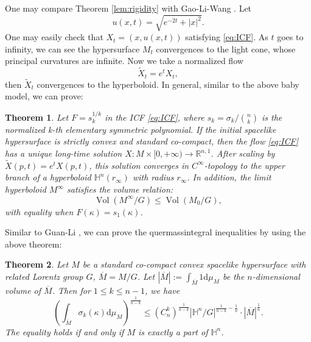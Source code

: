 \documentclass[10pt,a4paper]{amsart}
\newtheorem{theorem}{Theorem}[section]
\newcommand{\abs}[1]{\left\lvert{#1}\right\rvert}
\newcommand{\dd}{\ensuremath{\text{d}}}
\newcommand{\R}{\ensuremath{\mathbb{R}}}
\renewcommand{\H}{{\mathbb{H}}}
\numberwithin{equation}{section}
\begin{document}
 One may compare Theorem  \ref{lem:rigidity} with Gao-Li-Wang \cite{GaoLiW}. 
Let 
$$u(x,t)=\sqrt{e^{-2t}+|x|^2}.$$  
One may easily check that $X_t=(x,u(x,t))$ satisfying \eqref{eq:ICF}. As $t$ goes to infinity, we can see the hypersurface $M_t$ convergences to the light cone, whose principal curvatures are infinite. Now we take a normalized flow 
$$\tilde{X}_t=e^t X_t,$$   
then $\tilde{X}_t$ convergences to the hyperboloid. In general, similar to the above baby model, we can prove:   


\begin{theorem}\label{thm:convergence}
    Let \(F = s_k^{1/k}\) in the ICF \eqref{eq:ICF}, where \(s_k = {\sigma_k}/{\binom{n}{k}}\) is the normalized k-th elementary symmetric polynomial. If the initial spacelike hypersurface is strictly convex and standard co-compact, then the flow \eqref{eq:ICF} has a unique long-time solution \(X: M\times [0,+\infty)\to \R^{n,1}\). After scaling by \(\tilde{X}(p,t) = e^t X(p,t)\), this solution converges in \(C^{\infty}\)-topology to the upper branch of a hyperboloid \(\H^n(r_\infty)\) with radius \(r_{\infty}\). In addition, the limit hyperboloid \(M^{\infty}\) satisfies the volume relation: 
    \begin{equation*}
        \operatorname{Vol} (M^{\infty}/G) \leq \operatorname{Vol} (M_0/G),
    \end{equation*}
    with equality when \(F(\kappa) = s_1(\kappa)\). 
\end{theorem}



Similar to Guan-Li \cite{Guan2009}, we can prove the quermassintegral inequalities by using the above theorem:
\begin{theorem}\label{thm:quermassintegral_ineq}
    Let \(M\) be a standard co-compact convex spacelike hypersurface with related Lorentz group \(G\), \(\overline{M} = M / G\). Let \(\abs{\overline{M}} := \int_{\overline{M}} 1 \dd \mu_M\) be the \(n\)-dimensional volume of $\overline{M}$. Then for \(1\leq k \leq n-1\), we have
    \begin{equation}\label{eq:geo-ineq}
         {\left( \int_{\overline{M}} \sigma_k(\kappa) \dd \mu_M \right)^{\frac{1}{n-k}}} \leq {(C_n^k)^{\frac{1}{n-k}}\abs{\H^n / G}^{\frac{1}{n-k} - \frac{1}{n}}} \cdot \abs{\overline{M}}^{\frac{1}{n}}.
    \end{equation}
    The equality holds if and only if \(M\) is exactly a part of \(\H^n\). 
\end{theorem}
\end{document}
